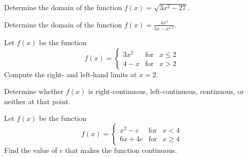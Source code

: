 \documentclass[12pt,addpoints, answers, fleqn]{exam}
\begin{document}
\begin{teacher}
\begin{questions}
Determine the domain of the function $f\left(x\right) = \sqrt{3x^2 - 27}$.


\begin{solution}
\end{solution}

\question 	%

Determine the domain of the function $f\left(x\right) = \displaystyle \frac{4x^3}{5x-x^{1/2}}$.


\begin{solution}
\end{solution}

\question 	%

Let $f\left(x\right)$ be the function
\[
f\left( x \right) =
\left\{
{\begin{array}{ccc}
3x^2 & \text{for} & x \leq 2\\[10pt]
4-x & \text{for} & x >2
\end{array}}
\right.
\]
Compute the right- and left-hand limits at $x = 2$.
Determine whether $f\left( x \right)$ is right-continuous, left-continuous, continuous, or neither at that point.


\begin{solution}
\end{solution}

\question 	%

Let $f\left(x\right)$ be the function
\[
f\left( x \right) =
\left\{
{\begin{array}{ccc}
x^2 - c & \text{for} & x < 4 \\[10pt]
6x + 4c & \text{for} & x  \geq 4
\end{array}}
\right.
\]
Find the value of $c$ that makes the function continuous.


\end{questions}
\end{teacher}
\end{document}
